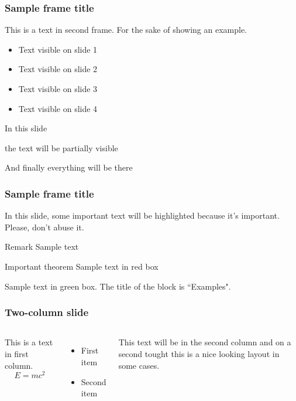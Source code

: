 \documentclass{beamer}
\begin{document}
      \begin{frame}
        \frametitle{Sample frame title}
        This is a text in second frame.
        For the sake of showing an example.

        \begin{itemize}
        \item<1-> Text visible on slide 1
        \item<2-> Text visible on slide 2
        \item<3> Text visible on slide 3
        \item<4-> Text visible on slide 4
        \end{itemize}

      \end{frame}

      \begin{frame}
        In this slide \pause

        the text will be partially visible \pause

        And finally everything will be there
      \end{frame}

      \begin{frame}
        \frametitle{Sample frame title}

        In this slide, some important text will be
        \alert{highlighted} because it's important.
        Please, don't abuse it.

        \begin{block}{Remark}
          Sample text
        \end{block}

        \begin{alertblock}{Important theorem}
          Sample text in red box
        \end{alertblock}

        \begin{examples}
          Sample text in green box. The title of the block is ``Examples".
        \end{examples}
      \end{frame}

      \begin{frame}
        \frametitle{Two-column slide}

        \begin{columns}
            This is a text in first column.
            $$E=mc^2$$
            \begin{itemize}
              \item First item
              \item Second item
            \end{itemize}

            This text will be in the second column
            and on a second tought this is a nice looking
            layout in some cases.
        \end{columns}
      \end{frame}
\end{document}
